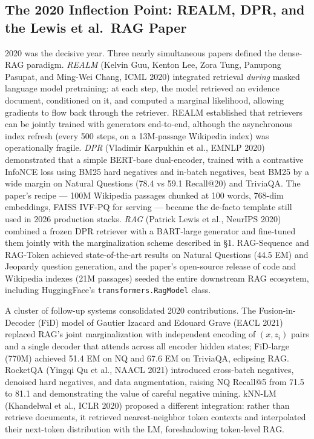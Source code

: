 \subsection{The 2020 Inflection Point: REALM, DPR, and the Lewis et al.~RAG Paper}\label{the-2020-inflection-point-realm-dpr-and-the-lewis-et-al.-rag-paper}

2020 was the decisive year. Three nearly simultaneous papers defined the dense-RAG paradigm. \emph{REALM} (Kelvin Guu, Kenton Lee, Zora Tung, Panupong Pasupat, and Ming-Wei Chang, ICML 2020) integrated retrieval \emph{during} masked language model pretraining: at each step, the model retrieved an evidence document, conditioned on it, and computed a marginal likelihood, allowing gradients to flow back through the retriever. REALM established that retrievers can be jointly trained with generators end-to-end, although the asynchronous index refresh (every 500 steps, on a 13M-passage Wikipedia index) was operationally fragile. \emph{DPR} (Vladimir Karpukhin et al., EMNLP 2020) demonstrated that a simple BERT-base dual-encoder, trained with a contrastive InfoNCE loss using BM25 hard negatives and in-batch negatives, beat BM25 by a wide margin on Natural Questions (78.4 vs 59.1 Recall@20) and TriviaQA. The paper's recipe --- 100M Wikipedia passages chunked at 100 words, 768-dim embeddings, FAISS IVF-PQ for serving --- became the de-facto template still used in 2026 production stacks. \emph{RAG} (Patrick Lewis et al., NeurIPS 2020) combined a frozen DPR retriever with a BART-large generator and fine-tuned them jointly with the marginalization scheme described in §1. RAG-Sequence and RAG-Token achieved state-of-the-art results on Natural Questions (44.5 EM) and Jeopardy question generation, and the paper's open-source release of code and Wikipedia indexes (21M passages) seeded the entire downstream RAG ecosystem, including HuggingFace's \texttt{transformers.RagModel} class.

A cluster of follow-up systems consolidated 2020 contributions. The Fusion-in-Decoder (FiD) model of Gautier Izacard and Edouard Grave (EACL 2021) replaced RAG's joint marginalization with independent encoding of \((x, z_i)\) pairs and a single decoder that attends across all encoder hidden states; FiD-large (770M) achieved 51.4 EM on NQ and 67.6 EM on TriviaQA, eclipsing RAG. RocketQA (Yingqi Qu et al., NAACL 2021) introduced cross-batch negatives, denoised hard negatives, and data augmentation, raising NQ Recall@5 from 71.5 to 81.1 and demonstrating the value of careful negative mining. kNN-LM (Khandelwal et al., ICLR 2020) proposed a different integration: rather than retrieve documents, it retrieved nearest-neighbor token contexts and interpolated their next-token distribution with the LM, foreshadowing token-level RAG.


